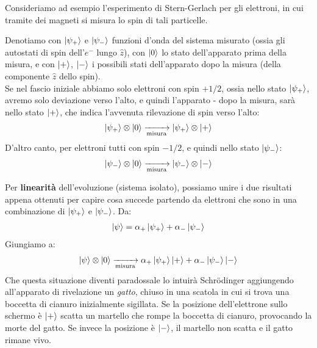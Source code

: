 \documentclass[../../FisicaTeorica.tex]{subfiles}
\begin{document}
Consideriamo ad esempio l'esperimento di Stern-Gerlach per gli elettroni, in cui tramite dei magneti si misura lo spin di tali particelle.

\begin{comment}
\begin{figure}[H]
\centering

\caption{Schema dell'apparato di Stern-Gerlach}
\end{figure}
\end{comment}

Denotiamo con $\Ket{\psi_+}$ e $\Ket{\psi_-}$ funzioni d'onda del sistema misurato (ossia gli autostati di spin dell'$e^-$ lungo $\hat{z}$), con $\Ket{0}$ lo stato dell'apparato prima della misura, e con $\Ket{+}$, $\Ket{-}$ i possibili stati dell'apparato dopo la misura (della componente $\hat{z}$ dello spin).\\
Se nel fascio iniziale abbiamo solo elettroni con spin $+1/2$, ossia nello stato $\Ket{\psi_+}$, avremo solo deviazione verso l'alto, e quindi l'apparato - dopo la misura, sarà nello stato $\Ket{+}$, che indica l'avvenuta rilevazione di spin verso l'alto: 
\begin{align*}
\Ket{\psi_+} \otimes \Ket{0} \xrightarrow[\text{misura}]{} \Ket{\psi_+}\otimes \Ket{+}
\end{align*}
D'altro canto, per elettroni tutti con spin $-1/2$, e quindi nello stato $\Ket{\psi_-}$:
\begin{align*}
\Ket{\psi_-}\otimes \Ket{0} \xrightarrow[\text{misura}]{} \Ket{\psi_-}\otimes \Ket{-}
\end{align*}

Per \textbf{linearità} dell'evoluzione (sistema isolato), possiamo unire i due risultati appena ottenuti per capire cosa succede partendo da elettroni che sono in una combinazione di $\Ket{\psi_+}$ e $\Ket{\psi_-}$. Da:
\begin{align*}
\Ket{\psi} = \alpha_+ \Ket{\psi_+} + \alpha_- \Ket{\psi_-}
\end{align*}
Giungiamo a:
\begin{align}
\Ket{\psi}\otimes \Ket{0} \xrightarrow[\text{misura}]{} \alpha_+ \Ket{\psi_+} \Ket{+} + \alpha_- \Ket{\psi_-} \Ket{-}
\label{eqn:misura-spin-gatto}
\end{align}
Che questa situazione diventi paradossale lo intuirà Schr\"odinger aggiungendo all'apparato di rivelazione un \textit{gatto}, chiuso in una scatola in cui si trova una boccetta di cianuro inizialmente sigillata. Se la posizione dell'elettrone sullo schermo è $\Ket{+}$ scatta un martello che rompe la boccetta di cianuro, provocando la morte del gatto. Se invece la posizione è $\Ket{-}$, il martello non scatta e il gatto rimane vivo.\\
\end{document}
